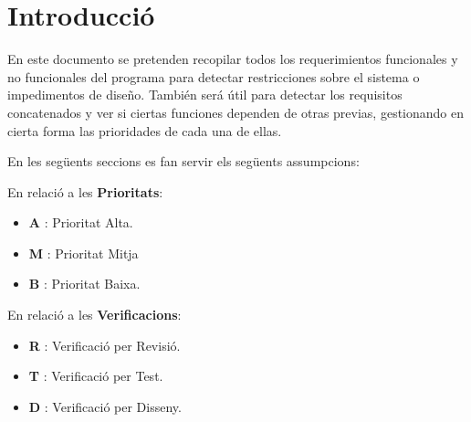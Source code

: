 \section{Introducció}\label{sec:intro}


En este documento se pretenden recopilar todos los requerimientos funcionales y no funcionales del programa para detectar restricciones sobre el sistema o impedimentos de diseño. También será útil para detectar los requisitos concatenados y ver si ciertas funciones dependen de otras previas, gestionando en cierta forma las prioridades de cada una de ellas.



En les següents seccions es fan servir els següents assumpcions:

En relació a les \textbf{Prioritats}:

\begin{itemize}
\item  \textbf{A} : Prioritat Alta.
\item  \textbf{M} : Prioritat Mitja
\item  \textbf{B} : Prioritat Baixa.
\end{itemize}

En relació a les \textbf{Verificacions}:

\begin{itemize}
\item  \textbf{R} : Verificació per Revisió.
\item  \textbf{T} : Verificació per Test.
\item  \textbf{D} : Verificació per Disseny.
\end{itemize}
